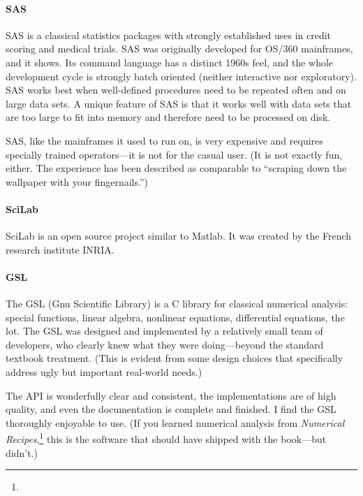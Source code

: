 \paragraph{SAS}
SAS is a classical statistics packages with strongly  
established uses in credit scoring and medical trials. SAS was
originally developed for OS/360 mainframes, and it shows.  Its command
language has a distinct 1960s feel, and the whole development cycle is
strongly batch oriented (neither interactive nor exploratory). SAS
works best when well-defined procedures need to be repeated often and
on large data sets. A unique feature of SAS is that it works well with
data sets that are too large to fit into memory and therefore need to
be processed on disk.\vspace*{3pt}

SAS, like the mainframes it used to run on, is very expensive and
requires specially trained operators---it is not for the casual user.
(It is not exactly fun, either. The experience has been described as
comparable to ``scraping down the wallpaper with your fingernails.'')

\paragraph{SciLab}
  SciLab is an open source project similar to  
Matlab. It was created by the French research institute INRIA.

\paragraph{GSL}
The GSL (Gnu Scientific Library) is a C library for  
classical numerical analysis: special functions, linear algebra,
nonlinear equations, differential equations, the lot. The GSL was
designed and implemented by a relatively small team of developers, who
clearly knew what they were doing---beyond the standard textbook
treatment. (This is evident from some design choices that specifically
address ugly but important real-world needs.)
  
The API is wonderfully clear and consistent, the implementations are
of high quality, and even the documentation is complete and finished.
I find the GSL thoroughly enjoyable to use.  (If you learned numerical
analysis from \textit{Numerical Recipes},\footnote{%
  } this is the
software that should have shipped with the book---but didn't.)

